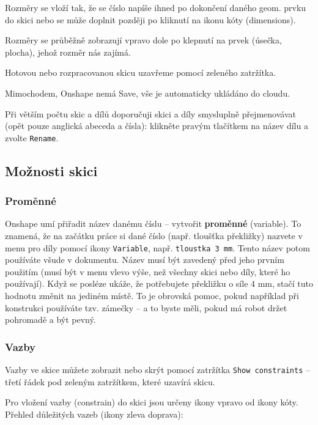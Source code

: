 Rozměry se vloží tak, že se číslo napíše ihned po dokončení daného geom. prvku do skici 
nebo se může doplnit později po kliknutí na ikonu kóty (dimensions).

Rozměry se průběžně zobrazují vpravo dole po klepnutí na prvek (úsečka, plocha), jehož rozměr nás zajímá. 

Hotovou nebo rozpracovanou skicu uzavřeme pomocí zeleného zatržítka. 

Mimochodem, Onshape nemá Save, vše je automaticky ukládáno do cloudu.

Při větším počtu skic a dílů doporučuji skici a díly smysluplně přejmenovávat (opět pouze anglická abeceda a čísla): klikněte pravým tlačítkem na název dílu a zvolte {\tt Rename}.

\subsection{Možnosti skici} \label{skica:moznosti}


\subsubsection{Proměnné}

Onshape umí přiřadit název danému číslu -- vytvořit \textbf{proměnné} (variable). 
To znamená, že na začátku práce si dané číslo (např. tloušťka překližky) nazvete v menu pro díly pomocí ikony {\tt Variable}, např. {\tt tloustka  3 mm}. 
Tento název potom používáte všude v dokumentu. 
Název musí být zavedený před jeho prvním použitím (musí být v menu vlevo výše, než všechny skici nebo  díly, které ho používají).
Když se posléze ukáže, že potřebujete překližku o síle 4 mm, stačí tuto hodnotu změnit na jediném místě. 
To je obrovská pomoc, pokud například při konstrukci používáte tzv. zámečky -- a to byste měli, pokud má robot držet pohromadě a být pevný. 

\subsubsection{Vazby}

Vazby ve skice můžete zobrazit nebo skrýt pomocí zatržítka {\tt Show constraints} -- třetí řádek pod zeleným zatržítkem, které uzavírá skicu. 

Pro vložení vazby (constrain) do skici jsou určeny ikony vpravo od ikony kóty. 
Přehled důležitých vazeb (ikony zleva doprava): 

